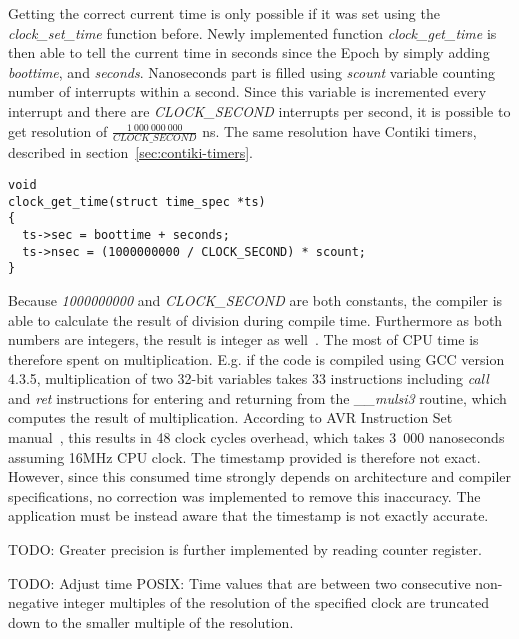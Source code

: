 

Getting the correct current time is only possible if it was set using
the {\it{clock\_set\_time}} function before.
Newly implemented function {\it{clock\_get\_time}} is then able to tell the
current time in seconds since the Epoch by simply adding {\it{boottime}},
and {\it{seconds}}.
Nanoseconds part is filled using {\it{scount}} variable counting number of
interrupts within a second.
Since this variable is incremented every interrupt and there are {\it{CLOCK\_SECOND}} interrupts
per second, it is possible to get resolution of $\frac{1~000~000~000}{CLOCK\_SECOND}$ ns.
The same resolution have Contiki timers, described in section~\ref{sec:contiki-timers}.
\begin{lstlisting}
void
clock_get_time(struct time_spec *ts)
{
  ts->sec = boottime + seconds;
  ts->nsec = (1000000000 / CLOCK_SECOND) * scount;
}
\end{lstlisting}
Because {\it{1000000000}} and {\it{CLOCK\_SECOND}} are both constants, the compiler is able to
calculate the result of division during compile time.
Furthermore as both numbers are integers, the result is integer as well~\cite{c99}.
The most of CPU time is therefore spent on multiplication.
E.g. if the code is compiled using GCC version 4.3.5,
multiplication of two 32-bit variables takes 33 instructions including {\it{call}} and {\it{ret}}
instructions for entering and returning from the {\it{\_\_mulsi3}} routine, which computes
the result of multiplication.
According to AVR Instruction Set manual~\cite{avr-instruction-set},
this results in 48 clock cycles overhead,
which takes 3~000 nanoseconds assuming 16MHz CPU clock.
The timestamp provided is therefore not exact.
However, since this consumed time strongly depends on architecture and compiler specifications,
no correction was implemented to remove this inaccuracy.
The application must be instead aware that the timestamp is not exactly accurate.

TODO: Greater precision is further implemented by reading counter register.

TODO: Adjust time
POSIX:
Time values that are between two consecutive non-negative integer multiples
of the resolution of the specified clock are truncated down to the smaller multiple of the resolution.

